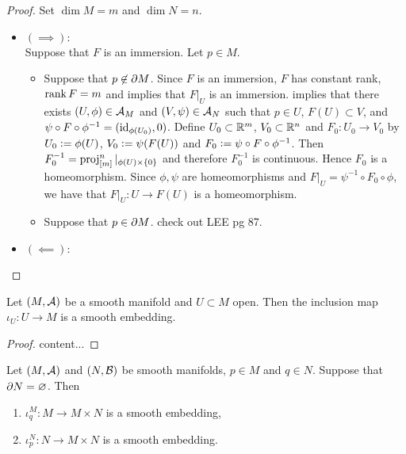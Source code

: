 \documentclass{book}
\begin{document}
	\begin{proof} Set $\dim M = m$ and $\dim N = n$. 
		\begin{itemize}
			\item $(\implies):$ \\
			Suppose that $F$ is an immersion. Let $p \in M$. 
			\begin{itemize}
				\item Suppose that $p \not \in \partial M$. Since $F$ is an immersion, $F$ has constant rank, $\operatorname{\text{rank}} F = m$ and  implies that $F|_U$ is an immersion.  implies that there exists $(U, \phi) \in \mathcal{A}_M$ and $(V, \psi) \in \mathcal{A}_N$ such that $p \in U$, $F(U) \subset V$, and $\psi \circ F \circ \phi^{-1} = (\operatorname{id}_{\phi(U_0)}, 0)$. Define $U_0 \subset \mathbb{R}^m$, $V_0 \subset \mathbb{R}^n$ and $F_0:U_0 \rightarrow V_0$ by $U_0 \vcentcolon= \phi(U)$, $V_0 \vcentcolon= \psi(F(U))$ and $F_0 \vcentcolon= \psi \circ F \circ \phi^{-1}$. Then $F_0^{-1} = \operatorname{\text{proj}}^n_{[m]}|_{\phi(U) \times \{0\}}$ and therefore $F_0^{-1}$ is continuous. Hence $F_0$ is a homeomorphism. Since $\phi, \psi$ are homeomorphisms and $F|_U = \psi^{-1} \circ F_0 \circ \phi$, we have that $F|_U: U \rightarrow F(U)$ is a homeomorphism. 
				\item Suppose that $p \in \partial M$.  check out LEE pg 87.
			\end{itemize}
			\item $(\impliedby):$ \\
			
		\end{itemize}
	\end{proof}

	\begin{ex} 
		Let $(M, \mathcal{A})$ be a smooth manifold and $U \subset M$ open. Then the inclusion map $\iota_U:U \rightarrow M$ is a smooth embedding. 
	\end{ex}

	\begin{proof}
		content...
	\end{proof}

	\begin{ex} 
		Let $(M, \mathcal{A})$ and $(N, \mathcal{B})$ be smooth manifolds, $p \in M$ and $q \in N$. Suppose that $\partial N = \varnothing$. Then 
		\begin{enumerate}
			\item $\iota^M_q: M \rightarrow M \times N$ is a smooth embedding,
			\item $\iota^N_p: N \rightarrow M \times N$ is a smooth embedding.
		\end{enumerate}
	\end{ex}
\end{document}
